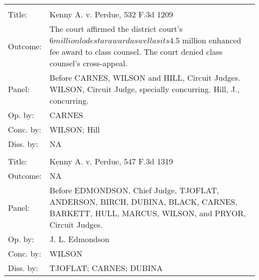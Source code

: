 \documentclass[10pt, letterpaper]{article}
\begin{document}
\begin{spacing}{1.0}
\begin{footnotesize}
\begin{longtable}[H]{lp{6in}}
        \arrayrulecolor{black}\hline\\[-4pt]
        Title: & Kenny A. v. Perdue, 532 F.3d 1209\\[2pt]
        Outcome: & The court affirmed the district court's $6 million lodestar award as well as its $4.5 million enhanced fee award to class counsel. The court denied class counsel's cross-appeal.\\[2pt]
        Panel: & Before CARNES, WILSON and HILL, Circuit Judges. WILSON, Circuit Judge, specially concurring. Hill, J., concurring.\\[2pt]
        Op. by: & CARNES\\[2pt]
        Conc. by: & WILSON; Hill\\[2pt]
        Diss. by: & NA\\[2pt]
        \arrayrulecolor{gray}\hline\\[-4pt]
        Title: & Kenny A. v. Perdue, 547 F.3d 1319\\[2pt]
        Outcome: & NA\\[2pt]
        Panel: & Before EDMONDSON, Chief Judge, TJOFLAT, ANDERSON, BIRCH, DUBINA, BLACK, CARNES, BARKETT, HULL, MARCUS, WILSON, and PRYOR, Circuit Judges.\\[2pt]
        Op. by: & J. L. Edmondson\\[2pt]
        Conc. by: & WILSON\\[2pt]
        Diss. by: & TJOFLAT; CARNES; DUBINA\\[2pt]
        

\end{longtable}
\end{footnotesize}
\end{spacing}
\end{document}
